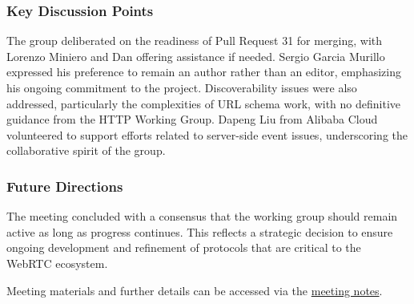 \documentclass{article}
\begin{document}
\subsubsection{Key Discussion Points}
The group deliberated on the readiness of Pull Request 31 for merging, with Lorenzo Miniero and Dan offering assistance if needed. Sergio Garcia Murillo expressed his preference to remain an author rather than an editor, emphasizing his ongoing commitment to the project. Discoverability issues were also addressed, particularly the complexities of URL schema work, with no definitive guidance from the HTTP Working Group. Dapeng Liu from Alibaba Cloud volunteered to support efforts related to server-side event issues, underscoring the collaborative spirit of the group.

\subsubsection{Future Directions}
The meeting concluded with a consensus that the working group should remain active as long as progress continues. This reflects a strategic decision to ensure ongoing development and refinement of protocols that are critical to the WebRTC ecosystem.

Meeting materials and further details can be accessed via the \href{https://notes.ietf.org/notes-ietf-122-wish}{meeting notes}.




\newpage
\end{document}

